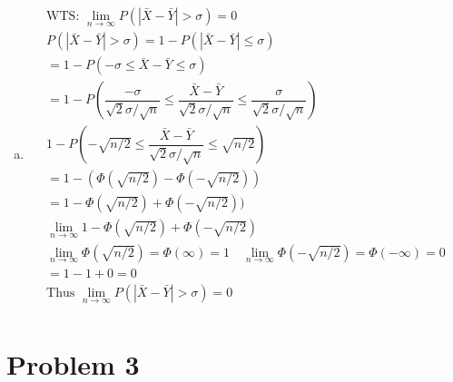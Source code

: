 \documentclass{article}
\newcommand{\limn}{\lim_{n\to \infty}}
\begin{document}
\begin{flushleft}
\begin{enumerate}[(a)]
	\item 
\begin{multline*}\\
\text{WTS: } \limn P(|\bar{X}-\bar{Y} |>\sigma)=0\\
P(|\bar{X}-\bar{Y} |>\sigma)=1-P(|\bar{X}-\bar{Y} |\leq\sigma)\\
=1-P(-\sigma\leq \bar{X}-\bar{Y}\leq \sigma)\\
=1-P\left(\dfrac{-\sigma}{\sqrt{2}\sigma/\sqrt{n}}\leq \dfrac{\bar{X}-\bar{Y}}{\sqrt{2}\sigma/\sqrt{n}}\leq \dfrac{\sigma}{\sqrt{2}\sigma/\sqrt{n}}\right)\\
1-P\left(-\sqrt{n/2}\leq \dfrac{\bar{X}-\bar{Y}}{\sqrt{2}\sigma/\sqrt{n}}\leq \sqrt{n/2}\right)\\
=1-(\Phi(\sqrt{n/2})-\Phi(-\sqrt{n/2}))\\
=1-\Phi(\sqrt{n/2})+\Phi(-\sqrt{n/2}))\\
\limn 1-\Phi(\sqrt{n/2})+\Phi(-\sqrt{n/2})\\
\limn \Phi(\sqrt{n/2})=\Phi(\infty) = 1 \quad \limn \Phi(-\sqrt{n/2})=\Phi(-\infty)=0\\
=1-1+0=0\\
\text{Thus }\limn P(|\bar{X}-\bar{Y} |>\sigma) = 0\\
\end{multline*}

\end{enumerate}

	\section*{Problem 3}
	

\end{flushleft}
\end{document}
